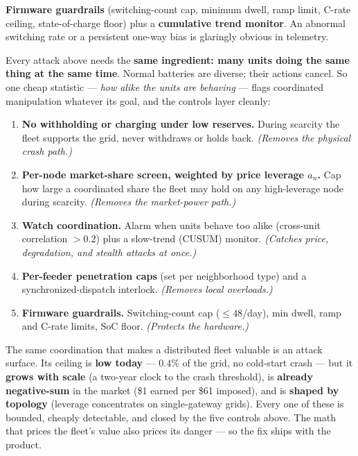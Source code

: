 \documentclass[11pt]{article}
\newcommand{\qsec}[1]{\vspace{4pt}\noindent{\large\bfseries\color{baseblue} #1}\par\vspace{2pt}}
\begin{document}
\begin{means}
\textbf{Firmware guardrails} (switching-count cap, minimum dwell, ramp limit,
C-rate ceiling, state-of-charge floor) plus a \textbf{cumulative trend monitor}. An
abnormal switching rate or a persistent one-way bias is glaringly obvious in
telemetry.
\end{means}

\qsec{What ties it all together --- and what Base should do}

Every attack above needs the \textbf{same ingredient: many units doing the same
thing at the same time}. Normal batteries are diverse; their actions cancel. So one
cheap statistic --- \emph{how alike the units are behaving} --- flags coordinated
manipulation whatever its goal, and the controls layer cleanly:

\begin{enumerate}
\item \textbf{No withholding or charging under low reserves.} During scarcity the
fleet supports the grid, never withdraws or holds back. \emph{(Removes the physical
crash path.)}
\item \textbf{Per-node market-share screen, weighted by price leverage $a_n$.} Cap
how large a coordinated share the fleet may hold on any high-leverage node during
scarcity. \emph{(Removes the market-power path.)}
\item \textbf{Watch coordination.} Alarm when units behave too alike (cross-unit
correlation $>0.2$) plus a slow-trend (CUSUM) monitor. \emph{(Catches price,
degradation, and stealth attacks at once.)}
\item \textbf{Per-feeder penetration caps} (set per neighborhood type) and a
synchronized-dispatch interlock. \emph{(Removes local overloads.)}
\item \textbf{Firmware guardrails.} Switching-count cap ($\le 48$/day), min dwell,
ramp and C-rate limits, SoC floor. \emph{(Protects the hardware.)}
\end{enumerate}

\begin{tcolorbox}[colback=baseblue!7,colframe=baseblue,boxrule=0.7pt,arc=2pt,
  title=Bottom line,fonttitle=\bfseries,coltitle=white]
The same coordination that makes a distributed fleet valuable is an attack surface.
Its ceiling is \textbf{low today} --- $0.4\%$ of the grid, no cold-start crash ---
but it \textbf{grows with scale} (a two-year clock to the crash threshold), is
\textbf{already negative-sum} in the market (\$1 earned per \$61 imposed), and is
\textbf{shaped by topology} (leverage concentrates on single-gateway grids). Every
one of these is bounded, cheaply detectable, and closed by the five controls above.
The math that prices the fleet's value also prices its danger --- so the fix ships
with the product.
\end{tcolorbox}
\end{document}
